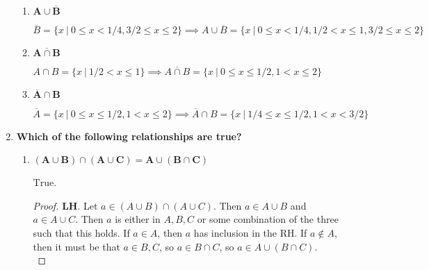 \documentclass[10pt, oneside]{article}   	%
\theoremstyle{definition}
\begin{document}
\begin{enumerate}[label=1.\arabic*]
\begin{enumerate}
	\item  \begin{tcolorbox}[
	  colback=Cerulean!5!white,
	  colframe=Cerulean!75!black]
	\textbf{$\bm{A \cup \overline{B}}$}
	\end{tcolorbox}
	
	$\overline{B} = \{ x \ | \ 0 \leq x < 1/4, 3/2 \leq x \leq 2 \} \implies \boxed{A \cup \overline{B} = \{ x \ | \ 0 \leq x < 1/4, 1/2 < x \leq 1, 3/2 \leq x \leq 2 \} }$
	
	\item  \begin{tcolorbox}[
	  colback=Cerulean!5!white,
	  colframe=Cerulean!75!black]
	\textbf{$\bm{\overline{A \cap B}}$}
	\end{tcolorbox}
	
	$A \cap B = \{ x \ | \ 1/2 < x \leq 1 \} \implies \boxed{ \overline{A \cap B} = \{ x \ | \ 0 \leq x \leq 1/2, 1 < x \leq 2 \} }$
	
	\item  \begin{tcolorbox}[
	  colback=Cerulean!5!white,
	  colframe=Cerulean!75!black]
	\textbf{$\bm{\overline{A} \cap B}$}
	\end{tcolorbox}
	
	$\overline{A} = \{ x \ | \ 0 \leq x \leq 1/2, 1 < x \leq 2 \} \implies \boxed{\overline{A} \cap B = \{ x \ | \ 1/4 \leq x \leq 1/2, 1 < x < 3/2 \}}$
	
	\end{enumerate}

\item  \begin{tcolorbox}[
  colback=Cerulean!5!white,
  colframe=Cerulean!75!black]
\textbf{Which of the following relationships are true?}
\end{tcolorbox}

	\begin{enumerate}
	\item  \begin{tcolorbox}[
	  colback=Cerulean!5!white,
	  colframe=Cerulean!75!black]
	\textbf{$\bm{(A \cup B) \cap (A \cup C) = A \cup (B \cap C)}$}
	\end{tcolorbox}
	
	$\boxed{\text{True}}$.
	
	\begin{proof}
	\textbf{LH}. Let $a \in (A \cup B) \cap (A \cup C)$. Then $a \in A \cup B$ and $a \in A \cup C$. Then $a$ is either in $A, B, C$ or some combination of the three such that this holds. If $a \in A$, then $a$ has inclusion in the RH. If $a \notin A$, then it must be that $a \in B, C$, so $a \in B \cap C$, so $a \in A \cup (B \cap C)$. \\
	

\end{proof}
\end{enumerate}
\end{enumerate}
\end{document}
